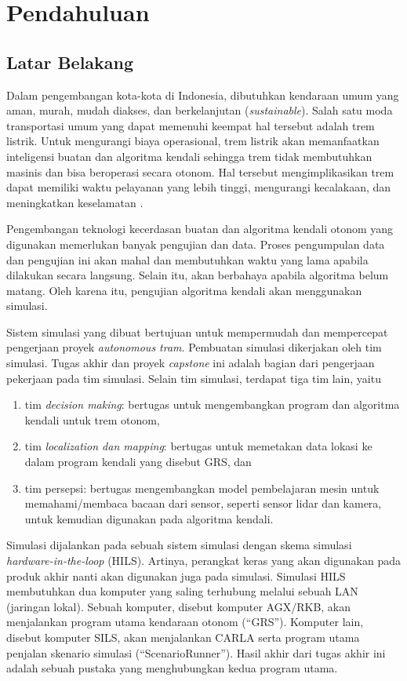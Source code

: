 \chapter{Pendahuluan}\label{chapter-1}

\section{Latar Belakang}

Dalam pengembangan kota-kota di Indonesia, dibutuhkan kendaraan umum yang aman,
murah, mudah diakses, dan berkelanjutan (\textit{sustainable}). Salah satu moda
transportasi umum yang dapat memenuhi keempat hal tersebut adalah trem listrik.
Untuk mengurangi biaya operasional, trem listrik akan memanfaatkan inteligensi
buatan dan algoritma kendali sehingga trem tidak membutuhkan masinis dan bisa
beroperasi secara otonom. Hal tersebut mengimplikasikan trem dapat memiliki
waktu pelayanan yang lebih tinggi, mengurangi kecalakaan, dan meningkatkan
keselamatan \parencite{trilaksono_laporanRispro}.

Pengembangan teknologi kecerdasan buatan dan algoritma kendali otonom yang
digunakan memerlukan banyak pengujian dan data. Proses pengumpulan data dan
pengujian ini akan mahal dan membutuhkan waktu yang lama apabila dilakukan
secara langsung. Selain itu, akan berbahaya apabila algoritma belum matang. Oleh
karena itu, pengujian algoritma kendali akan menggunakan simulasi.

Sistem simulasi yang dibuat bertujuan untuk mempermudah dan mempercepat
pengerjaan proyek \textit{autonomous tram}. Pembuatan simulasi dikerjakan oleh
tim simulasi. Tugas akhir dan proyek \textit{capstone} ini adalah bagian dari
pengerjaan pekerjaan pada tim simulasi. Selain tim simulasi, terdapat tiga tim
lain, yaitu
\begin{enumerate}
	\item tim \textit{decision making}: bertugas untuk mengembangkan program dan
	      algoritma kendali untuk trem otonom,
	\item tim \textit{localization dan mapping}: bertugas untuk memetakan data
	      lokasi ke dalam program kendali yang disebut GRS, dan
	\item tim persepsi: bertugas mengembangkan model pembelajaran mesin untuk
	      memahami/membaca bacaan dari sensor, seperti sensor lidar dan kamera,
	      untuk kemudian digunakan pada algoritma kendali.
\end{enumerate}

Simulasi dijalankan pada sebuah sistem simulasi dengan skema simulasi
\textit{hardware-in-the-loop} (HILS). Artinya, perangkat keras yang akan
digunakan pada produk akhir nanti akan digunakan juga pada simulasi. Simulasi
HILS membutuhkan dua komputer yang saling terhubung melalui sebuah LAN
(jaringan lokal). Sebuah komputer, disebut komputer AGX/RKB, akan menjalankan
program utama kendaraan otonom (``GRS''). Komputer lain, disebut komputer SILS,
akan menjalankan CARLA serta program utama penjalan skenario simulasi
(``ScenarioRunner''). Hasil akhir dari tugas akhir ini adalah sebuah pustaka
yang menghubungkan kedua program utama.

